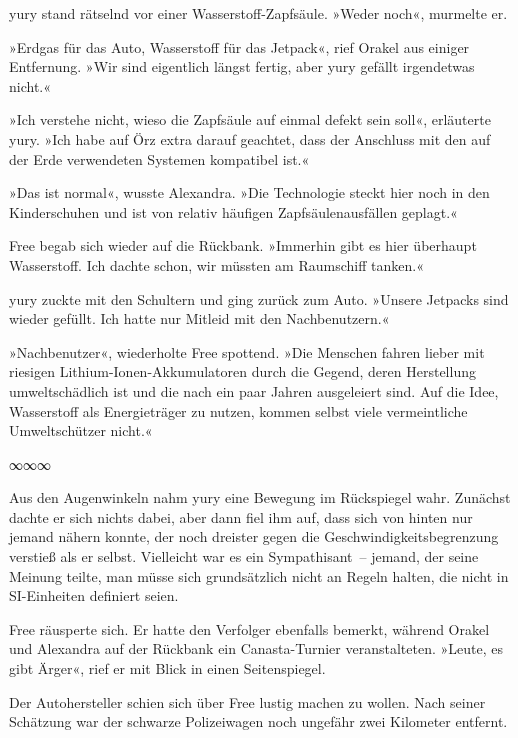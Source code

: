 yury stand rätselnd vor einer Wasserstoff-Zapfsäule. »Weder noch«, murmelte er.

»Erdgas für das Auto, Wasserstoff für das Jetpack«, rief Orakel aus einiger Entfernung. »Wir sind eigentlich längst fertig, aber yury gefällt irgendetwas nicht.«

»Ich verstehe nicht, wieso die Zapfsäule auf einmal defekt sein soll«, erläuterte yury. »Ich habe auf Örz extra darauf geachtet, dass der Anschluss mit den auf der Erde verwendeten Systemen kompatibel ist.«

»Das ist normal«, wusste Alexandra. »Die Technologie steckt hier noch in den Kinderschuhen und ist von relativ häufigen Zapfsäulenausfällen geplagt.«

Free begab sich wieder auf die Rückbank. »Immerhin gibt es hier überhaupt Wasserstoff. Ich dachte schon, wir müssten am Raumschiff tanken.«

yury zuckte mit den Schultern und ging zurück zum Auto. »Unsere Jetpacks sind wieder gefüllt. Ich hatte nur Mitleid mit den Nachbenutzern.«

»Nachbenutzer«, wiederholte Free spottend. »Die Menschen fahren lieber mit riesigen Lithium-Ionen-Akkumulatoren durch die Gegend, deren Herstellung umweltschädlich ist und die nach ein paar Jahren ausgeleiert sind. Auf die Idee, Wasserstoff als Energieträger zu nutzen, kommen selbst viele vermeintliche Umweltschützer nicht.«

\begin{center}
∞∞∞
\end{center}

Aus den Augenwinkeln nahm yury eine Bewegung im Rückspiegel wahr. Zunächst dachte er sich nichts dabei, aber dann fiel ihm auf, dass sich von hinten nur jemand nähern konnte, der noch dreister gegen die Geschwindigkeitsbegrenzung verstieß als er selbst. Vielleicht war es ein Sympathisant~– jemand, der seine Meinung teilte, man müsse sich grundsätzlich nicht an Regeln halten, die nicht in SI-Einheiten definiert seien.

Free räusperte sich. Er hatte den Verfolger ebenfalls bemerkt, während Orakel und Alexandra auf der Rückbank ein Canasta-Turnier veranstalteten. »Leute, es gibt Ärger«, rief er mit Blick in einen Seitenspiegel.

 Der Autohersteller schien sich über Free lustig machen zu wollen. Nach seiner Schätzung war der schwarze Polizeiwagen noch ungefähr zwei Kilometer entfernt.

